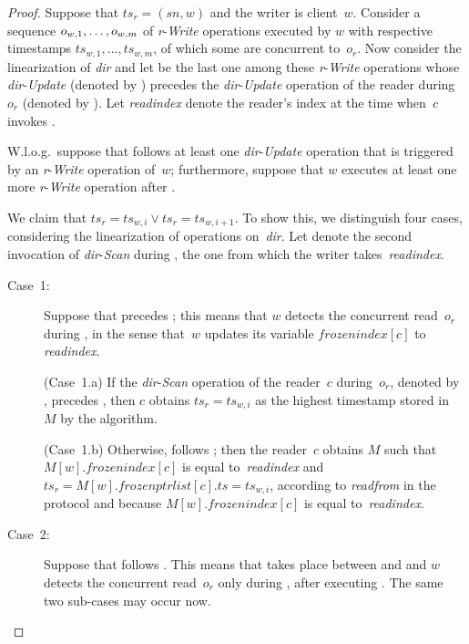 \documentclass[oribibl]{llncs}
\theoremstyle{definition-boldhead}
\newcommand{\var}[1]{\textit{#1}}
\newcommand{\op}[1]{\textsl{#1}}
\newcommand{\dir}{\var{dir}\xspace}
\begin{document}
\begin{proof}
  Suppose that $\var{ts}_r = (\var{sn}, w)$ and the writer is
  client~$w$.  Consider a sequence $o_{w,1}, \ldots, o_{w,m}$ of
  \var{r}-\op{Write} operations executed by $w$ with respective
  timestamps $\var{ts}_{w,1}, \ldots, \var{ts}_{w,m}$, of which some
  are concurrent to~$o_r$.  Now consider the linearization of \dir and
  let  be the last one among these \var{r}-\op{Write}
  operations whose \dir-\op{Update} (denoted by ) precedes
  the \dir-\op{Update} operation of the reader during~$o_r$ (denoted
  by \updaterd).  Let \var{readindex} denote the reader's index
at the time when~$c$ invokes \updaterd.

  W.l.o.g.\ suppose that \updaterd follows at least one
  \dir-\op{Update} operation that is triggered by an
  \var{r}-\op{Write} operation of~$w$; furthermore, suppose that $w$
  executes at least one more \var{r}-\op{Write} operation
   after .

  We claim that $\var{ts}_r = \var{ts}_{w,i} \lor \var{ts}_r =
  \var{ts}_{w,i+1}$.  To show this, we distinguish four cases,
  considering the linearization of operations on~\dir.  Let 
  denote the second invocation of \dir-\op{Scan} during , the
  one from which the writer takes~\var{readindex}.\begin{description}
  \item[Case~1:] Suppose that \updaterd precedes ; this
    means that $w$ detects the concurrent read~$o_r$ during ,
    in the sense that~$w$ updates its variable $\var{frozenindex}[c]$ to
    \var{readindex}.

    (Case~1.a) If the \dir-\op{Scan} operation of the reader~$c$
    during~$o_r$, denoted by \scanrd, precedes , then
    $c$ obtains $\var{ts}_r = \var{ts}_{w,i}$ as the highest timestamp
    stored in~$M$ by the algorithm.

    (Case~1.b) Otherwise, \scanrd follows ; then the
    reader~$c$ obtains $M$ such that $M[w].\var{frozenindex}[c]$ is equal
    to~\var{readindex} and $\var{ts}_r =
    M[w].\var{frozenptrlist}[c].\var{ts} = \var{ts}_{w,i}$, according to
    \op{readfrom} in the protocol and because $M[w].\var{frozenindex}[c]$
    is equal to~\var{readindex}.


  \item[Case~2:] Suppose that \updaterd follows .  This
    means that \updaterd{} takes place between  and
     and $w$ detects the concurrent read~$o_r$ only
    during , after executing .  The same two
    sub-cases may occur now.


\end{description}
\end{proof}
\end{document}
